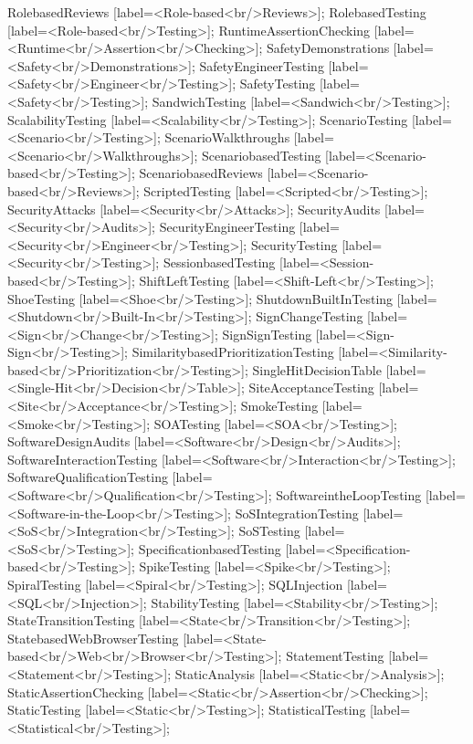 \documentclass{article}
\begin{document}
{RolebasedReviews [label=<Role-based<br/>Reviews>];
RolebasedTesting [label=<Role-based<br/>Testing>];
RuntimeAssertionChecking [label=<Runtime<br/>Assertion<br/>Checking>];
SafetyDemonstrations [label=<Safety<br/>Demonstrations>];
SafetyEngineerTesting [label=<Safety<br/>Engineer<br/>Testing>];
SafetyTesting [label=<Safety<br/>Testing>];
SandwichTesting [label=<Sandwich<br/>Testing>];
ScalabilityTesting [label=<Scalability<br/>Testing>];
ScenarioTesting [label=<Scenario<br/>Testing>];
ScenarioWalkthroughs [label=<Scenario<br/>Walkthroughs>];
ScenariobasedTesting [label=<Scenario-based<br/>Testing>];
ScenariobasedReviews [label=<Scenario-based<br/>Reviews>];
ScriptedTesting [label=<Scripted<br/>Testing>];
SecurityAttacks [label=<Security<br/>Attacks>];
SecurityAudits [label=<Security<br/>Audits>];
SecurityEngineerTesting [label=<Security<br/>Engineer<br/>Testing>];
SecurityTesting [label=<Security<br/>Testing>];
SessionbasedTesting [label=<Session-based<br/>Testing>];
ShiftLeftTesting [label=<Shift-Left<br/>Testing>];
ShoeTesting [label=<Shoe<br/>Testing>];
ShutdownBuiltInTesting [label=<Shutdown<br/>Built-In<br/>Testing>];
SignChangeTesting [label=<Sign<br/>Change<br/>Testing>];
SignSignTesting [label=<Sign-Sign<br/>Testing>];
SimilaritybasedPrioritizationTesting [label=<Similarity-based<br/>Prioritization<br/>Testing>];
SingleHitDecisionTable [label=<Single-Hit<br/>Decision<br/>Table>];
SiteAcceptanceTesting [label=<Site<br/>Acceptance<br/>Testing>];
SmokeTesting [label=<Smoke<br/>Testing>];
SOATesting [label=<SOA<br/>Testing>];
SoftwareDesignAudits [label=<Software<br/>Design<br/>Audits>];
SoftwareInteractionTesting [label=<Software<br/>Interaction<br/>Testing>];
SoftwareQualificationTesting [label=<Software<br/>Qualification<br/>Testing>];
SoftwareintheLoopTesting [label=<Software-in-the-Loop<br/>Testing>];
SoSIntegrationTesting [label=<SoS<br/>Integration<br/>Testing>];
SoSTesting [label=<SoS<br/>Testing>];
SpecificationbasedTesting [label=<Specification-based<br/>Testing>];
SpikeTesting [label=<Spike<br/>Testing>];
SpiralTesting [label=<Spiral<br/>Testing>];
SQLInjection [label=<SQL<br/>Injection>];
StabilityTesting [label=<Stability<br/>Testing>];
StateTransitionTesting [label=<State<br/>Transition<br/>Testing>];
StatebasedWebBrowserTesting [label=<State-based<br/>Web<br/>Browser<br/>Testing>];
StatementTesting [label=<Statement<br/>Testing>];
StaticAnalysis [label=<Static<br/>Analysis>];
StaticAssertionChecking [label=<Static<br/>Assertion<br/>Checking>];
StaticTesting [label=<Static<br/>Testing>];
StatisticalTesting [label=<Statistical<br/>Testing>];
}
\end{document}
